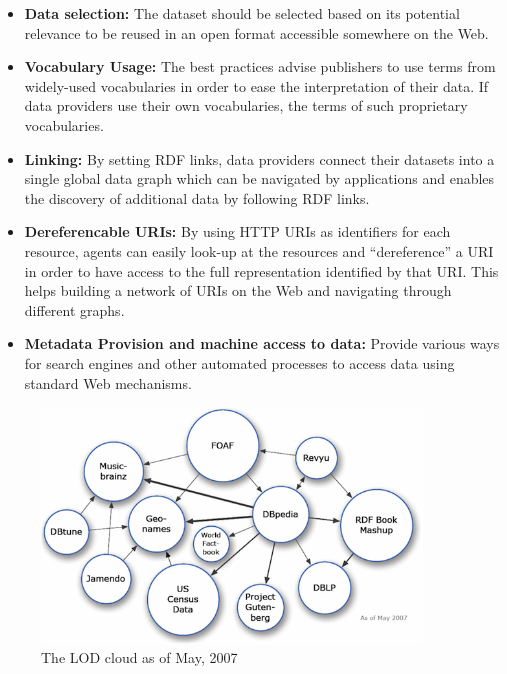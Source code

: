 \begin{itemize}
\item \textbf{Data selection:} The dataset should be selected based on its potential relevance to be reused in an open format accessible somewhere on the Web.
\item \textbf{Vocabulary Usage:} The best practices advise publishers to use terms from widely-used vocabularies in order to ease the interpretation of their data. If data providers use their own vocabularies, the terms of such proprietary vocabularies.

\item \textbf{Linking:} By setting RDF links, data providers connect their datasets into a single global data graph which can be navigated by applications and enables the discovery of additional data by following RDF links.

\item \textbf{Dereferencable URIs:} By using HTTP URIs as identifiers for each resource, agents can easily look-up at the resources and ``dereference'' a URI in order to have access to the full representation identified by that URI. This helps building a network of URIs on the Web and navigating through different graphs. 

\item \textbf{Metadata Provision and machine access to data:} Provide various ways for search engines and other automated processes to access data using standard Web mechanisms.
\end{itemize}

\begin{figure}[ht!]
\includegraphics[width=0.9\textwidth]{img/lod-cloud2007.png}
\caption{The LOD cloud as of May, 2007}
\label{fig:lodcloud2007}
\end{figure}

